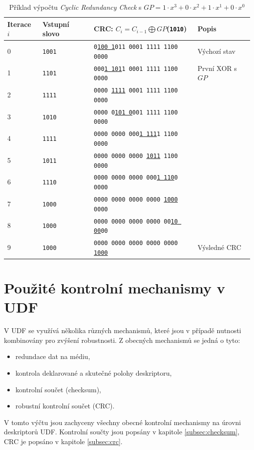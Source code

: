 \begin{table}[h]
    \centering
    \begin{tabular}{ | l | l | l | l | }
        \hline
        Iterace $i$ & Vstupní slovo & \makecell{CRC:\\$C_{i}=C_{i-1} \bigoplus GP$(\texttt{1010})}  & Popis \\ \hline\hline
        0           & \texttt{1001} & \texttt{0\underline{100 1}011 0001 1111 1100 0000}         & Výchozí stav \\ \hline
        1           & \texttt{1101} & \texttt{000\underline{1 101}1 0001 1111 1100 0000}         & První XOR s $GP$ \\ \hline
        2           & \texttt{1111} & \texttt{0000 \underline{1111} 0001 1111 1100 0000}         & \\ \hline
        3           & \texttt{1010} & \texttt{0000 0\underline{101 0}001 1111 1100 0000}                & \\ \hline
        4           & \texttt{1111} & \texttt{0000 0000 000\underline{1 111}1 1100 0000}                & \\ \hline
        5           & \texttt{1011} & \texttt{0000 0000 0000 \underline{1011} 1100 0000}                & \\ \hline
        6           & \texttt{1110} & \texttt{0000 0000 0000 000\underline{1 110}0 0000}                & \\ \hline
        7           & \texttt{1000} & \texttt{0000 0000 0000 0000 \underline{1000} 0000}                & \\ \hline
        8           & \texttt{1000} & \texttt{0000 0000 0000 0000 00\underline{10 00}00}                & \\ \hline
        9           & \texttt{1000} & \texttt{0000 0000 0000 0000 0000 \underline{1000}}           & Výsledné CRC\\ \hline
    \end{tabular}
    \label{tab:crc-example}
    \caption{Příklad výpočtu \textit{Cyclic Redundancy Check} s $GP=1 \cdot x^3 + 0 \cdot x^2 + 1 \cdot x^1 + 0 \cdot x^0$}
\end{table}

\section{Použité kontrolní mechanismy v UDF}
\label{sec:kontrolni-mechanismy}
V UDF se využívá několika různých mechanismů, které jsou v případě nutnosti kombinovány pro zvýšení robustnosti. Z obecných mechanismů se jedná o tyto:
\begin{itemize}
    \item redundace dat na médiu,
    \item kontrola deklarované a skutečné polohy deskriptoru,
    \item kontrolní součet (checksum),
    \item robustní kontrolní součet (CRC).
\end{itemize}
V tomto výčtu jsou zachyceny všechny obecné kontrolní mechanismy na úrovni deskriptorů UDF. Kontrolní součty jsou popsány v kapitole \ref{subsec:checksum}, CRC je popsáno v kapitole \ref{subsec:crc}.

